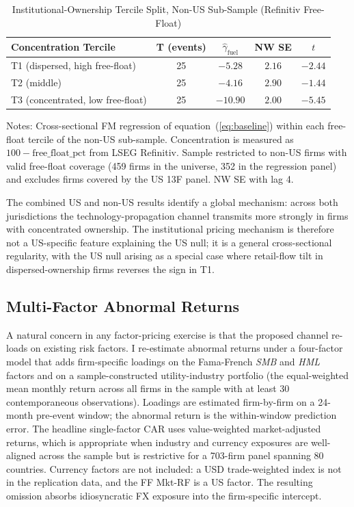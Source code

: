 \documentclass[12pt,a4paper]{article}
\begin{document}
\begin{table}[H]
\centering
\caption{Institutional-Ownership Tercile Split, Non-US Sub-Sample (Refinitiv Free-Float)}
\label{tab:institutional_split_nonus}
\begin{tabular}{lcccc}
\toprule
Concentration Tercile & T (events) & $\hat\gamma_{\text{fuel}}$ & NW SE & $t$ \\
\midrule
T1 (dispersed, high free-float) & 25 & $-5.28$ & $2.16$ & $-2.44$ \\
T2 (middle) & 25 & $-4.16$ & $2.90$ & $-1.44$ \\
T3 (concentrated, low free-float) & 25 & $-10.90$ & $2.00$ & $-5.45$ \\
\bottomrule
\end{tabular}
\begin{flushleft}\footnotesize
Notes: Cross-sectional FM regression of equation~(\ref{eq:baseline}) within each free-float tercile of the non-US sub-sample. Concentration is measured as $100 - \text{free\_float\_pct}$ from LSEG Refinitiv. Sample restricted to non-US firms with valid free-float coverage (459 firms in the universe, 352 in the regression panel) and excludes firms covered by the US 13F panel. NW SE with lag 4.
\end{flushleft}
\end{table}

The combined US and non-US results identify a global mechanism: across both jurisdictions the technology-propagation channel transmits more strongly in firms with concentrated ownership. The institutional pricing mechanism is therefore not a US-specific feature explaining the US null; it is a general cross-sectional regularity, with the US null arising as a special case where retail-flow tilt in dispersed-ownership firms reverses the sign in T1.

\subsection{Multi-Factor Abnormal Returns}\label{sec:multifactor}

A natural concern in any factor-pricing exercise is that the proposed channel re-loads on existing risk factors. I re-estimate abnormal returns under a four-factor model that adds firm-specific loadings on the Fama-French \emph{SMB} and \emph{HML} factors and on a sample-constructed utility-industry portfolio (the equal-weighted mean monthly return across all firms in the sample with at least 30 contemporaneous observations). Loadings are estimated firm-by-firm on a 24-month pre-event window; the abnormal return is the within-window prediction error. The headline single-factor CAR uses value-weighted market-adjusted returns, which is appropriate when industry and currency exposures are well-aligned across the sample but is restrictive for a 703-firm panel spanning 80 countries. Currency factors are not included: a USD trade-weighted index is not in the replication data, and the FF Mkt-RF is a US factor. The resulting omission absorbs idiosyncratic FX exposure into the firm-specific intercept.
\end{document}
